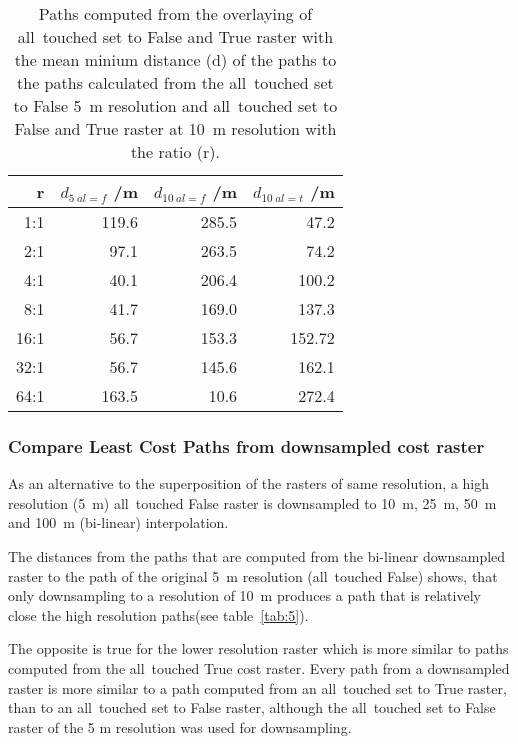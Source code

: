 \begin{table}[h!]
	\caption{Paths computed from the overlaying of all~touched set to False and True raster with the mean minium distance (d) of the paths to the paths calculated from the all~touched set to False 5~m resolution and all~touched set to False and True raster at 10~m resolution with the ratio (r).}
	\label{tab:4}
	\centering
	\begin{tabular}{ r  r  r  r}
		r & $d_{5~al=f}$ /m &  $d_{10~al=f}$ /m & $d_{10~al=t}$ /m \\
		\hline
		
		  1:1  &    119.6 &  285.5 &  47.2\\
		  2:1  &    97.1 &  263.5 &  74.2\\
		  4:1  &    40.1 &  206.4 & 100.2\\
		  8:1  &    41.7 &  169.0 & 137.3\\
		 16:1  &    56.7 &  153.3 & 152.72\\
		 32:1  &    56.7 &  145.6 & 162.1\\
		 64:1  &   163.5 &   10.6 & 272.4\\
		
	\end{tabular}
\end{table}


\subsubsection{Compare Least Cost Paths from downsampled cost raster}

As an alternative to the superposition of the rasters of same resolution, a high resolution (5~m) all~touched False raster is downsampled to 10~m, 25~m, 50~m and 100~m (bi-linear) interpolation.

The distances from the paths that are computed from the bi-linear downsampled raster to the path of the original 5~m resolution (all~touched False) shows, that only downsampling to a resolution of 10~m produces a path that is relatively close the high resolution paths(see table~\ref{tab:5}).

The opposite is true for the lower resolution raster which is more similar to paths computed from the all~touched True cost raster.
Every path from a downsampled raster is more similar to a path computed from an all~touched set to True raster, than to an all~touched set to False raster, although the all~touched set to False raster of the 5 m resolution was used for downsampling.

